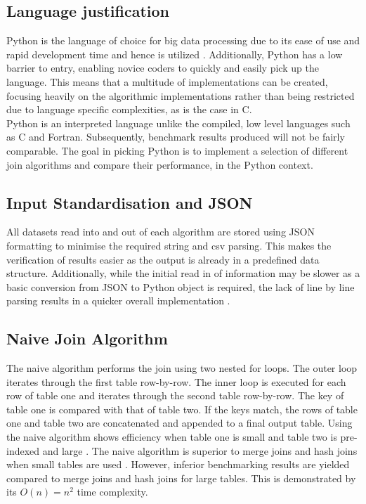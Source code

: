\documentclass[10.5 pt, conference]{IEEEtran}
\begin{document}
\subsection{Language justification}
Python is the language of choice for big data processing due to its ease of use and rapid development time and hence is utilized \cite{Beck}. Additionally, Python has a low barrier to entry, enabling novice coders to quickly and easily pick up the language. This means that a multitude of implementations can be created, focusing heavily on the algorithmic implementations rather than being restricted due to language specific complexities, as is the case in C. \\

Python is an interpreted language unlike the compiled, low level languages such as C and Fortran. Subsequently, benchmark results produced will not be fairly comparable. The goal in picking Python is to implement a selection of different join algorithms and compare their performance, in the Python context.

\subsection{Input Standardisation and JSON}
All datasets read into and out of each algorithm are stored using JSON formatting to minimise the required string and csv parsing. This makes the verification of results easier as the output is already in a predefined data structure. Additionally, while the initial read in of information may be slower as a basic conversion from JSON to Python object is required, the lack of line by line parsing results in a quicker overall implementation \cite{TutorialsPoint2018}.

\subsection{Naive Join Algorithm}

The naive algorithm performs the join using two nested for loops. The outer loop iterates through the first table row-by-row. The inner loop is executed for each row of table one and iterates through the second table row-by-row. The key of table one is compared with that of table two. If the keys match, the rows of table one and table two are concatenated and appended to a final output table. Using the naive algorithm shows efficiency when table one is small and table two is pre-indexed and large \cite{Microsoft2012}. The naive algorithm is superior to merge joins and hash joins when small tables are used \cite{Microsoft2012}. However, inferior benchmarking results are yielded compared to merge joins and hash joins for large tables. This is demonstrated by its $O(n) = n^2$ time complexity. \\
\end{document}
